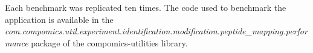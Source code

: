 \documentclass{bioinfo}
\begin{document}
\begin{methods}
Each benchmark was replicated ten times. The code used to benchmark the application is available in the \textit{com.compomics.util.experiment.identification.modification.peptide\_mapping.performance} package of the compomics-utilities library.









\end{methods}

\end{document}
